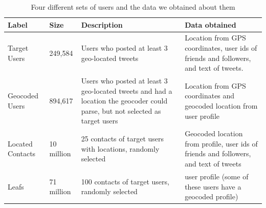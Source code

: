 %
%



\begin{table}[tb]
\scriptsize
\centering
\begin{tabular}{l l p{4cm} p{6cm}}
    Label & Size & Description & Data obtained \\
    \hline
    Target Users & 249,584 & Users who posted at least 3 geo-located tweets &
    Location from GPS coordinates, user ids of friends and followers,
    and text of tweets. \\
    Geocoded Users & 894,617 & Users who posted at least 3 geo-located tweets
    and had a location the geocoder could parse, but not selected as target users &
    Location from GPS coordinates and geocoded location from user profile \\
    Located Contacts & 10 million & 25 contacts of target users with locations, randomly selected &
    Geocoded location from profile, user ids of friends and followers, and text of tweets \\
    Leafs & 71 million & 100 contacts of target users, randomly selected &
    user profile (some of these users have a geocoded profile)\\
\end{tabular}
\caption{Four different sets of users and the data we obtained about them}
\label{tab:datasets}
\end{table}




